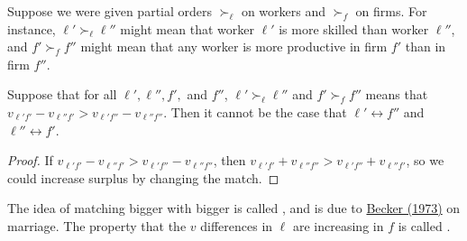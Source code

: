 \documentclass[10pt]{article}
\begin{document}
Suppose we were given partial orders $\succ_\ell$ on workers and $\succ_f$ on firms. For instance, $\ell' \succ_\ell \ell''$ might mean that worker $\ell'$ is more skilled than worker $\ell''$, and $f' \succ_f f''$ might mean that any worker is more productive in firm $f'$ than in firm $f''$. 

\begin{proposition}
	Suppose that for all $\ell',\ell'',f',$ and $f''$, $\ell' \succ_\ell \ell''$ and $f' \succ_f f''$ means that $v_{\ell' f'} - v_{\ell'' f'} > v_{\ell' f''} - v_{\ell''f''}$. Then it cannot be the case that $\ell' \leftrightarrow f''$ and $\ell'' \leftrightarrow f'$. 
\end{proposition}
\begin{proof}
	If $v_{\ell' f'} - v_{\ell'' f'} > v_{\ell' f''} - v_{\ell''f''}$, then $v_{\ell' f'} + v_{\ell'' f''} > v_{\ell' f''} + v_{\ell'' f'}$, so we could increase surplus by changing the match.
\end{proof}
\begin{remark}
	The idea of matching bigger with bigger is called , and is due to \href{https://www.jstor.org/stable/1831130?seq=1}{Becker (1973)} on marriage. The property that the $v$ differences in $\ell$ are increasing in $f$ is called .
\end{remark}
\end{document}

